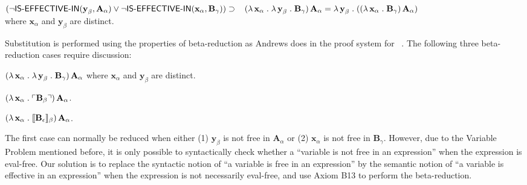 \documentclass[fleqn]{llncs}
\begin{document}
\begin{minipage}{\textwidth}
    \item[] $(\neg \mbox{\sf IS-EFFECTIVE-IN}(\textbf{y}_\beta,\textbf{A}_\alpha)\vee 
      \neg \mbox{\sf IS-EFFECTIVE-IN}(\textbf{x}_\alpha,\textbf{B}_\gamma)) \supset {}\\ 
      \hspace*{2ex}(\lambda\, \textbf{x}_\alpha \mathrel. 
      \lambda\, \textbf{y}_\beta \mathrel. \textbf{B}_\gamma) \, \textbf{A}_\alpha =
      \lambda\, \textbf{y}_\beta \mathrel. 
      ((\lambda\, \textbf{x}_\alpha \mathrel. \textbf{B}_\gamma) \, \textbf{A}_\alpha)$\\
      where $\textbf{x}_\alpha$ and $\textbf{y}_\beta$ are distinct.

   \ei

\end{minipage}

\medskip

Substitution is performed using
the properties of beta-reduction as Andrews does in the proof system
for {\qzero}~\cite[p.~213]{Andrews02}.  The following three
beta-reduction cases require discussion:

\vspace*{-2.5mm}
\be

  \item $(\lambda\, \textbf{x}_\alpha \mathrel. \lambda\,
    \textbf{y}_\beta \mathrel. \textbf{B}_\gamma) \, \textbf{A}_\alpha$
    where $\textbf{x}_\alpha$ and $\textbf{y}_\beta$ are distinct.

  \item $(\lambda\, \textbf{x}_\alpha \mathrel.
      \ulcorner\textbf{B}_\beta\urcorner) \, \textbf{A}_\alpha$.

  \item $(\lambda\, \textbf{x}_\alpha \mathrel.
    \llbracket\textbf{B}_\epsilon\rrbracket_\beta) \, \textbf{A}_\alpha$.

\ee

The first case can normally be reduced when either (1)
$\textbf{y}_\beta$ is not free in $\textbf{A}_\alpha$ or (2)
$\textbf{x}_\alpha$ is not free in $\textbf{B}_\gamma$.  However, due
to the Variable Problem mentioned before, it is only possible to
syntactically check whether a ``variable is not free in an
expression'' when the expression is eval-free.  Our solution
is to replace the syntactic notion of ``a variable is free in
an expression'' by the semantic notion of ``a variable is effective in
an expression'' when the expression is not necessarily eval-free, and
use Axiom B13 to perform the beta-reduction.  
\end{document}
